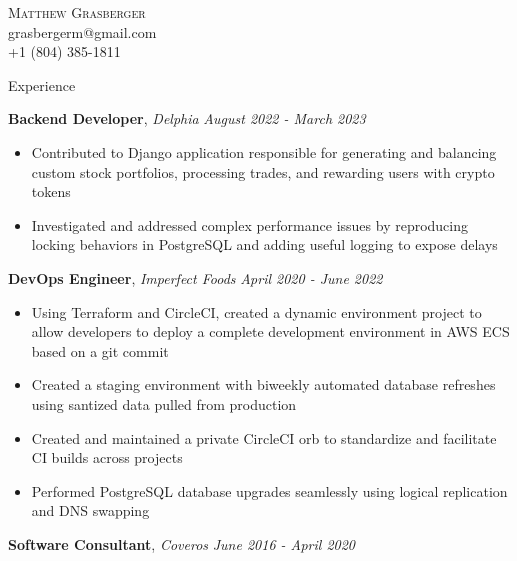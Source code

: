 \documentclass[9pt]{article}
\newenvironment{changemargin}[2]{%
  \begin{list}{}{%
    \setlength{\topsep}{0pt}%
    \setlength{\leftmargin}{#1}%
    \setlength{\rightmargin}{#2}%
    \setlength{\listparindent}{\parindent}%
    \setlength{\itemindent}{\parindent}%
    \setlength{\parsep}{\parskip}%
  }%
  \item[]}{\end{list}
}
\newcommand{\lineover}{
	\begin{changemargin}{-0.05in}{-0.05in}
		\vspace*{-8pt}
		\hrulefill \\
		\vspace*{-2pt}
	\end{changemargin}
}
\newcommand{\header}[1]{
	\begin{changemargin}{-0.5in}{-0.5in}
		\scshape{#1}\\
  	\lineover
	\end{changemargin}
}
\newcommand{\contact}[4]{
	\begin{changemargin}{-0.5in}{-0.5in}
		\begin{center}
			{\Large \scshape {#1}}\\ \smallskip
			{#2}\\ \smallskip 
			{#3}\\ \smallskip
			{#4}\smallskip
		\end{center}
	\end{changemargin}
}
\newenvironment{body} {
	\vspace*{-10pt}
	\begin{changemargin}{-0.25in}{-0.5in}
  }	
	{\end{changemargin}
}
\begin{document}
\contact{Matthew Grasberger}{grasbergerm@gmail.com}{+1 (804) 385-1811}


%
%
%
%
\header{Experience}

\begin{body}
	
	\vspace{14pt}
        \textbf{Backend Developer}, \emph{Delphia} \hfill \emph{August 2022 - March 2023}\\
	\vspace*{-4pt}
	\begin{itemize} \itemsep -0pt  %
		\item  Contributed to Django application responsible for generating and balancing custom stock portfolios, processing trades, and rewarding users with crypto tokens
            \item  Investigated and addressed complex performance issues by reproducing locking behaviors in PostgreSQL and adding useful logging to expose delays
	\end{itemize}
        \textbf{DevOps Engineer}, \emph{Imperfect Foods} \hfill \emph{April 2020 - June 2022}\\
	\vspace*{-4pt}
	\begin{itemize} \itemsep -0pt  %
		\item  Using Terraform and CircleCI, created a dynamic environment project to allow developers to deploy a complete development environment in AWS ECS based on a git commit
		\item  Created a staging environment with biweekly automated database refreshes using santized data pulled from production
		\item  Created and maintained a private CircleCI orb to standardize and facilitate CI builds across projects
		\item  Performed PostgreSQL database upgrades seamlessly using logical replication and DNS swapping
	\end{itemize}
	\textbf{Software Consultant}, \emph{Coveros} \hfill \emph{June 2016 - April 2020}\\

\end{body}
\end{document}
